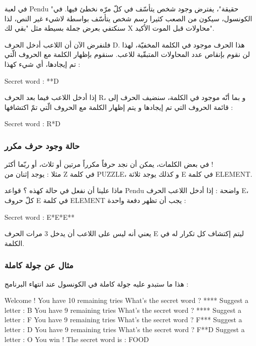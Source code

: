 \begin{information}
في لعبة
\textenglish{Pendu}
"حقيقة"، يفترض وجود شخص يتأسّف في كلّ مرّه نخطئ فيها. في الكونسول، سيكون من الصعب كثيرا رسم شخص يتأسّف بواسطة لاشيء غير النص،  لذا سنكتفي بعرض جملة بسيطة مثل "بقي لك
\textenglish{X}
محاولات قبل الموت الأكيد".
\end{information}

فلنفرض الآن أن اللاعب أدخل الحرف
\textenglish{D}.
هذا الحرف موجود في الكلمة المخفيّة، لهذا لن نقوم بإنقاص عدد المحاولات المتبقّية للاعب. سنقوم بإظهار الكلمة مع الحروف الّتي تم إيجادها، أي شيء كهذا :

\begin{Console}
Secret word : **D
\end{Console}

إذا أدخل اللاعب فيما بعد الحرف
\textenglish{R}،
و بما أنّه موجود في الكلمة، سنضيف الحرف إلى قائمة الحروف التي تم إيجادها و يتم إظهار الكلمة مع الحروف الّتي تمّ اكتشافها :

\begin{Console}
Secret word : R*D
\end{Console}

\subsubsection{حالة وجود حرف مكرر}
في بعض الكلمات، يمكن أن نجد حرفاً مكرراً مرتين أو ثلاث، أو ربّما أكثر !\\
مثلا : يوجد إثنان من
\textenglish{Z}
في كلمة
\textenglish{PUZZLE}،
و كذلك يوجد ثلاثة
\textenglish{E}
في كلمة
\textenglish{ELEMENT}.

ماذا علينا أن نفعل في حالة كهذه ؟ قواعد
\textenglish{Pendu}
واضحة : إذا أدخل اللاعب الحرف
\textenglish{E}،
كلّ حروف
\textenglish{E}
في كلمة
\textenglish{ELEMENT}
يجب أن تظهر دفعة واحدة :

\begin{Console}
Secret word : E*E*E**
\end{Console}

يعني أنه ليس على اللاعب أن يدخل 3 مرات الحرف
\textenglish{E}
ليتم إكتشاف كل تكرار له في الكلمة.

\subsubsection{مثال عن جولة كاملة}
هذا ما ستبدو عليه جولة كاملة في الكونسول عند انتهاء البرنامج :

\begin{Console}
Welcome !
You have 10 remaining tries
What's the secret word ? ****
Suggest a letter : B
You have 9 remaining tries
What's the secret word ? ****
Suggest a letter : F
You have 9 remaining tries
What's the secret word ? F***
Suggest a letter : D
You have 9 remaining tries
What's the secret word ? F**D
Suggest a letter : O
You win ! The secret word is  : FOOD
\end{Console}

